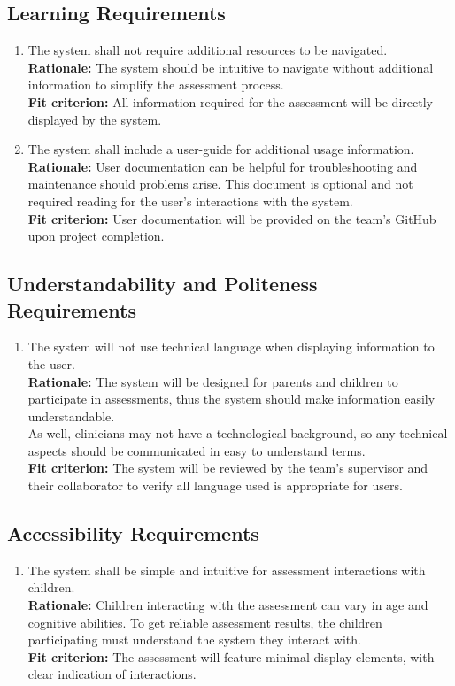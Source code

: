 \documentclass[12pt]{article}
\begin{document}
\subsection{Learning Requirements}
\begin{enumerate}[label={UH-LI\arabic*}. ]
  \item The system shall not require additional resources to be navigated.\\
  \textbf{Rationale: }The system should be intuitive to navigate without additional information to simplify the assessment process.\\
  \textbf{Fit criterion: }All information required for the assessment will be directly displayed by the system.
  \item The system shall include a user-guide for additional usage information.\\
  \textbf{Rationale: }User documentation can be helpful for troubleshooting and maintenance should problems arise. This document is optional and not required reading for the user's interactions with the system.\\
  \textbf{Fit criterion: }User documentation will be provided on the team's GitHub upon project completion.
\end{enumerate}
\subsection{Understandability and Politeness Requirements}
\begin{enumerate}[label={UH-UP\arabic*}. ]
  \item The system will not use technical language when displaying information to the user.\\
  \textbf{Rationale: }The system will be designed for parents and children to participate in assessments, thus the system should make information easily understandable.\\
  As well, clinicians may not have a technological background, so any technical aspects should be communicated in easy to understand terms.\\
  \textbf{Fit criterion: }The system will be reviewed by the team's supervisor and their collaborator to verify all language used is appropriate for users.
\end{enumerate}
\subsection{Accessibility Requirements}
\begin{enumerate}[label={UH-AR\arabic*}. ]
  \item The system shall be simple and intuitive for assessment interactions with children.\\
  \textbf{Rationale: }Children interacting with the assessment can vary in age and cognitive abilities. To get reliable assessment results, the children participating must understand the system they interact with.\\
  \textbf{Fit criterion: }The assessment will feature minimal display elements, with clear indication of interactions.
\end{enumerate}
\end{document}
